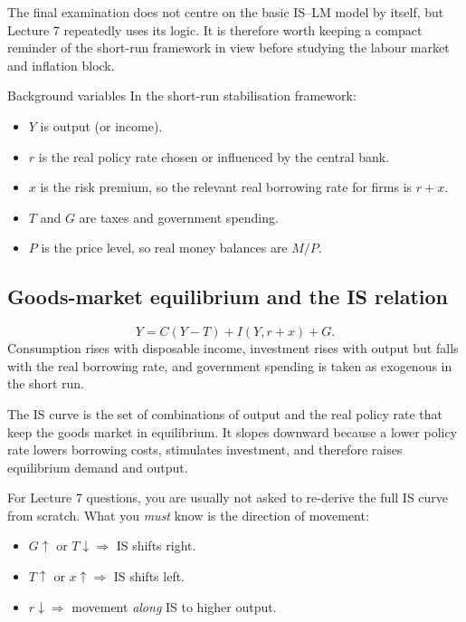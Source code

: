 \documentclass[12pt]{article}
\begin{document}
The final examination does not centre on the basic IS--LM model by itself, but Lecture 7 repeatedly uses its logic. It is therefore worth keeping a compact reminder of the short-run framework in view before studying the labour market and inflation block.

\begin{definition}{Background variables}{}
In the short-run stabilisation framework:
\begin{itemize}[leftmargin=1.5em]
\item $Y$ is output (or income).
\item $r$ is the real policy rate chosen or influenced by the central bank.
\item $x$ is the risk premium, so the relevant real borrowing rate for firms is $r+x$.
\item $T$ and $G$ are taxes and government spending.
\item $P$ is the price level, so real money balances are $M/P$.
\end{itemize}
\end{definition}

\subsection{Goods-market equilibrium and the IS relation}

\begin{keyformula}
\[
Y = C(Y-T)+I(Y,r+x)+G.
\]
Consumption rises with disposable income, investment rises with output but falls with the real borrowing rate, and government spending is taken as exogenous in the short run.
\end{keyformula}

The IS curve is the set of combinations of output and the real policy rate that keep the goods market in equilibrium. It slopes downward because a lower policy rate lowers borrowing costs, stimulates investment, and therefore raises equilibrium demand and output.

\begin{examtip}[title={Exam Focus: Background assumed from IS--LM}]
For Lecture 7 questions, you are usually not asked to re-derive the full IS curve from scratch. What you \emph{must} know is the direction of movement:
\begin{itemize}[leftmargin=1.5em]
\item $G \uparrow$ or $T \downarrow \Rightarrow$ IS shifts right.
\item $T \uparrow$ or $x \uparrow \Rightarrow$ IS shifts left.
\item $r \downarrow \Rightarrow$ movement \emph{along} IS to higher output.
\end{itemize}
\end{examtip}
\end{document}
